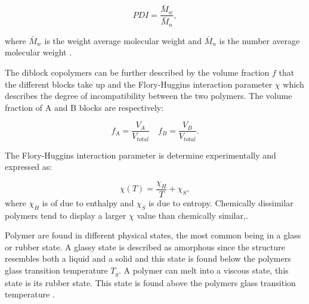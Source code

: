 \documentclass[MasterThesisMain.tex]{subfiles}
\begin{document}
\begin{equation}
PDI = \frac{\bar{M}_w}{\bar{M}_n},
\end{equation} 

where $\bar{M}_w$ is the weight average molecular weight and $\bar{M}_n$ is the number average molecular weight \cite{strobl2007physics}.

The diblock copolymers can be further described by the volume fraction $f$ that the different blocks take up and the Flory-Huggins interaction parameter $\chi$ which describes the degree of incompatibility between the two polymers. The volume fraction of A and B blocks are respectively:

\begin{equation}
f_A = \frac{V_A}{V_{total}} \quad f_B=\frac{V_B}{V_{total}}.
\end{equation}

The Flory-Huggins interaction parameter is determine experimentally and expressed as:

\begin{equation}
\chi(T) = \frac{\chi_H}{T} + \chi_S,
\end{equation} 
where $\chi_H$ is of due to enthalpy and $\chi_S$ is due to entropy. Chemically dissimilar polymers tend to display a larger $\chi$ value than chemically similar,\cite{BCPthermo}\cite{FHpolymer}.

Polymer are found in different physical states, the most common being in a glass or rubber state. A glassy state is described as amorphous since the structure resembles both a liquid and a solid and this state is found below the polymers glass transition temperature $T_g$. A polymer can melt into a viscous state, this state is its rubber state. This state is found above the polymers glass transition temperature \cite{petty2008molecular}. 
\end{document}
